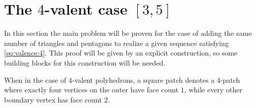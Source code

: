 \section{The $4$-valent case $[3, 5]$}
In this section the main problem will be proven for the case of adding the same number of triangles and pentagons to realize a given sequence satisfying \autoref{eq:valence:4}. This proof will be given by an explicit construction, so some building blocks for this construction will be needed. 

\begin{definition}\label{def:square:patch}
  When in the case of $4$-valent polyhedrons, a square patch denotes a $4$-patch where exactly four vertices on the outer have face  count $1$, while every other boundary vertex has face count $2$.
\end{definition}


